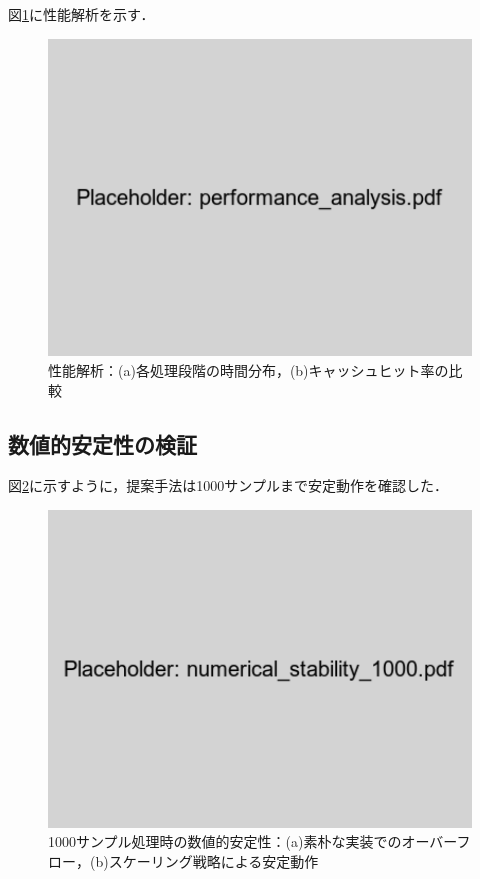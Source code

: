 \documentclass[paper]{ieicej}
\begin{document}
図\ref{fig:performance_analysis}に性能解析を示す．

\begin{figure}[t]
\centering
\includegraphics[width=0.85\linewidth]{performance_analysis.pdf}
\caption{性能解析：(a)各処理段階の時間分布，(b)キャッシュヒット率の比較}
\label{fig:performance_analysis}
\end{figure}

\subsection{数値的安定性の検証}

図\ref{fig:stability}に示すように，提案手法は1000サンプルまで安定動作を確認した．

\begin{figure}[t]
\centering
\includegraphics[width=0.85\linewidth]{numerical_stability_1000.pdf}
\caption{1000サンプル処理時の数値的安定性：(a)素朴な実装でのオーバーフロー，(b)スケーリング戦略による安定動作}
\label{fig:stability}
\end{figure}
\end{document}
